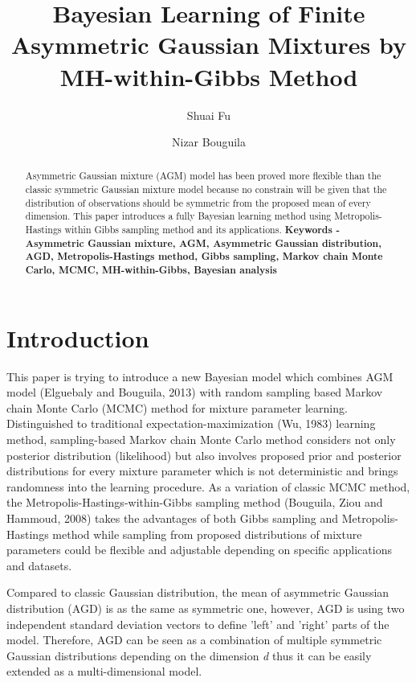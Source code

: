 \documentclass[conference]{llncs}
\begin{document}
\title{Bayesian Learning of Finite Asymmetric Gaussian Mixtures by MH-within-Gibbs Method}

\author{Shuai Fu \and Nizar Bouguila}



\maketitle

\begin{abstract}
Asymmetric Gaussian mixture (AGM) model has been proved more flexible than the classic symmetric Gaussian mixture model because no constrain will be given that the distribution of observations should be symmetric from the proposed mean of every dimension. This paper introduces a fully Bayesian learning method using Metropolis-Hastings within Gibbs sampling method and its applications.
\bigbreak
\textbf{Keywords - Asymmetric Gaussian mixture, AGM, Asymmetric Gaussian distribution, AGD, Metropolis-Hastings method, Gibbs sampling, Markov chain Monte Carlo, MCMC, MH-within-Gibbs, Bayesian analysis}
\end{abstract}

\section{Introduction}
This paper is trying to introduce a new Bayesian model which combines AGM model (Elguebaly and Bouguila, 2013) \cite{b1} with random sampling based Markov chain Monte Carlo (MCMC) method for mixture parameter learning. Distinguished to traditional expectation-maximization (Wu, 1983)\cite{b2} learning method, sampling-based Markov chain Monte Carlo method considers not only posterior distribution (likelihood) but also involves proposed prior and posterior distributions for every mixture parameter which is not deterministic and brings randomness into the learning procedure. As a variation of classic MCMC method, the Metropolis-Hastings-within-Gibbs sampling method (Bouguila, Ziou and Hammoud, 2008)\cite{b3} takes the advantages of both Gibbs sampling and Metropolis-Hastings method while sampling from proposed distributions of mixture parameters could be flexible and adjustable depending on specific applications and datasets. 

Compared to classic Gaussian distribution, the mean of asymmetric Gaussian distribution (AGD) is as the same as symmetric one, however, AGD is using two independent standard deviation vectors to define 'left' and 'right' parts of the model. Therefore, AGD can be seen as a combination of multiple symmetric Gaussian distributions depending on the dimension \textsl{d} thus it can be easily extended as a multi-dimensional model.
\end{document}
